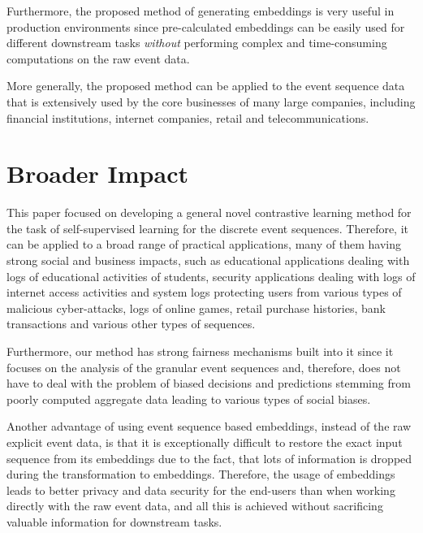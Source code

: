 \documentclass[sigconf, anonymous]{acmart}
\begin{document}
Furthermore, the proposed method of generating embeddings is very useful in production environments since pre-calculated embeddings can be easily used for different downstream tasks \emph{without} performing complex and time-consuming computations on the raw event data.

More generally, the proposed method can be applied to the event sequence data that is extensively used by the core businesses of many large companies, including financial institutions, internet companies, retail and telecommunications.

\iffalse

\section*{Broader Impact}

This paper focused on developing a general novel contrastive learning method for the task of self-supervised learning for the discrete event sequences. Therefore, it can be applied to a broad range of practical applications, many of them having strong social and business impacts, such as educational applications dealing with logs of educational activities of  students, security applications dealing with logs of internet access activities and system logs protecting users from various types of malicious cyber-attacks, logs of online games, retail purchase histories, bank transactions and various other types of sequences. 

Furthermore, our method has strong fairness mechanisms built into it since it focuses on the analysis of the granular event sequences and, therefore, does not have to deal with the problem of biased decisions and predictions stemming from poorly computed aggregate data leading to various types of social biases.

Another advantage of using event sequence based embeddings, instead of the raw explicit event data, is that it is exceptionally difficult to restore the exact input sequence from its embeddings due to the fact, that lots of information is dropped during the transformation to embeddings. Therefore, the usage of embeddings leads to better privacy and data security for the end-users than when working directly with the raw event data, and all this is achieved without sacrificing valuable information for downstream tasks.
\end{document}

